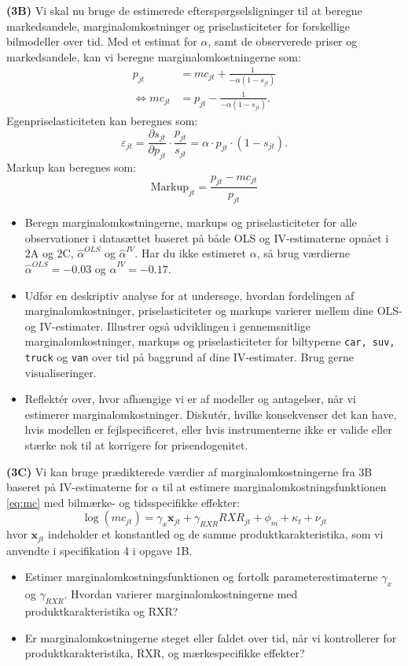 \documentclass[a4paper,12pt]{article}
\begin{document}
\noindent \textbf{(3B)} Vi skal nu bruge de estimerede efterspørgselsligninger til at beregne markedsandele, marginalomkostninger og priselasticiteter for forskellige bilmodeller over tid. Med et estimat for \(\alpha\), samt de observerede priser og markedsandele, kan vi beregne marginalomkostningerne som:
\begin{align}
    p_{jt} &= mc_{jt} + \frac{1}{- \alpha (1 - s_{jt})} \\   
    \iff mc_{jt} &= p_{jt} - \frac{1}{- \alpha (1 - s_{jt})}.
\end{align}
Egenpriselasticiteten kan beregnes som:
$$
\varepsilon_{jt} = \frac{\partial s_{jt}}{\partial p_{jt}} \cdot \frac{p_{jt}}{s_{jt}} = \alpha \cdot p_{jt} \cdot (1 - s_{jt}).
$$
Markup kan beregnes som:
$$
\text{Markup}_{jt} = \frac{p_{jt} - mc_{jt}}{p_{jt}} 
$$

\begin{itemize}
    \item  Beregn marginalomkostningerne, markups og priselasticiteter for alle observationer i datasættet baseret på både OLS og IV-estimaterne opnået i 2A og 2C, \(\hat{\alpha}^{OLS}\) og \(\hat{\alpha}^{IV}\). Har du ikke estimeret $\alpha$, så brug værdierne $\hat{\alpha}^{OLS} = -0.03$ og $\hat{\alpha}^{IV} = -0.17$.
    \item Udfør en deskriptiv analyse for at undersøge, hvordan fordelingen af marginalomkostninger, priselasticiteter og markups varierer mellem dine OLS- og IV-estimater. Illustrer også udviklingen i gennemsnitlige marginalomkostninger, markups og priselasticiteter for biltyperne \texttt{car, suv, truck} og \texttt{van} over tid på baggrund af dine IV-estimater. Brug gerne visualiseringer. 
    \item Reflektér over, hvor afhængige vi er af modeller og antagelser, når vi estimerer marginalomkostninger. Diskutér, hvilke konsekvenser det kan have, hvis modellen er fejlspecificeret, eller hvis instrumenterne ikke er valide eller stærke nok til at korrigere for prisendogenitet. 
\end{itemize}
\hrulefill

\bigskip \bigskip

\noindent \textbf{(3C)} Vi kan bruge prædikterede værdier af marginalomkostningerne fra 3B baseret på IV-estimaterne for \(\alpha\) til at estimere marginalomkostningsfunktionen \eqref{eq:mc} med bilmærke- og tidsspecifikke effekter:
\begin{equation}
    \log(mc_{jt}) = \gamma_x \mathbf{x}_{jt} + \gamma_{RXR} RXR_{jt}  + \phi_m +  \kappa_t  + \nu_{jt}
\end{equation}
hvor $\mathbf{x}_{jt}$ indeholder et konstantled og de samme produktkarakteristika, som vi anvendte i specifikation 4 i opgave 1B.
\begin{itemize}
    \item Estimer marginalomkostningsfunktionen og fortolk parameterestimaterne \(\gamma_x\) og \(\gamma_{RXR}\). Hvordan varierer marginalomkostningerne med produktkarakteristika og RXR?
    \item Er marginalomkostningerne steget eller faldet over tid, når vi kontrollerer for produktkarakteristika, RXR, og mærkespecifikke effekter?
\end{itemize} 
\bigskip \bigskip
\end{document}
